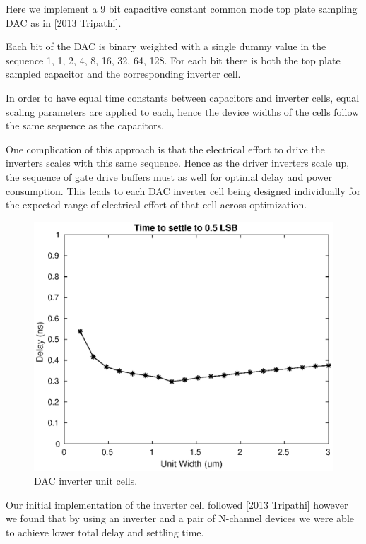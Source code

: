 \documentclass[10pt,journal]{IEEEtran}\usepackage{longtable}
\begin{document}
Here we implement a 9 bit capacitive constant common mode top plate sampling DAC as in [2013 Tripathi].

Each bit of the DAC is binary weighted with a single dummy value in the
sequence 1, 1, 2, 4, 8, 16, 32, 64, 128.
For each bit there is both the top plate sampled capacitor and the corresponding inverter cell.

In order to have equal time constants between capacitors and inverter cells, equal scaling parameters are applied to each, hence the device widths of the cells follow the same sequence as the capacitors.

One complication of this approach is that the electrical effort to drive the inverters scales with this same sequence. 
Hence as the driver inverters scale up, the sequence of gate drive buffers must as well for optimal delay and power consumption.
This leads to each DAC inverter cell being designed individually for the expected range of electrical effort of that cell across optimization.

\begin{figure}[tbph]
\begin{center}
\includegraphics[width=1\columnwidth]{dac_optimization.eps}
\caption{DAC inverter unit cells.}
\label{fig:DACUnitInverterSch}
\end{center}
\end{figure}

Our initial implementation of the inverter cell followed [2013 Tripathi] however we found that by using an inverter and a pair of N-channel devices we were able to achieve lower total delay and settling time. 
\end{document}
